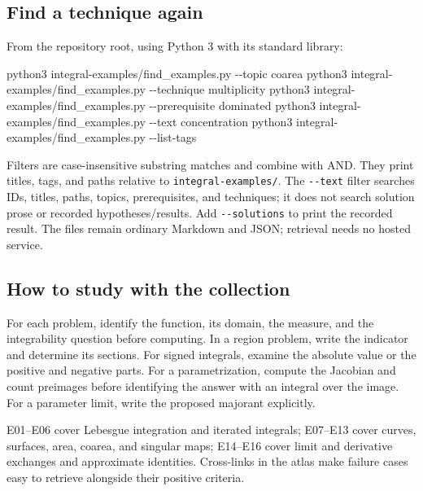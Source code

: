 \documentclass[
  11pt,
]{article}
\newenvironment{Shaded}{}{}
\newcommand{\AttributeTok}[1]{\textcolor[rgb]{0.49,0.56,0.16}{#1}}
\newcommand{\ExtensionTok}[1]{#1}
\newcommand{\NormalTok}[1]{#1}
\begin{document}
\subsection{Find a technique again}\label{find-a-technique-again}

From the repository root, using Python 3 with its standard library:

\begin{Shaded}
\begin{Highlighting}[]
\ExtensionTok{python3}\NormalTok{ integral{-}examples/find\_examples.py }\AttributeTok{{-}{-}topic}\NormalTok{ coarea}
\ExtensionTok{python3}\NormalTok{ integral{-}examples/find\_examples.py }\AttributeTok{{-}{-}technique}\NormalTok{ multiplicity}
\ExtensionTok{python3}\NormalTok{ integral{-}examples/find\_examples.py }\AttributeTok{{-}{-}prerequisite}\NormalTok{ dominated}
\ExtensionTok{python3}\NormalTok{ integral{-}examples/find\_examples.py }\AttributeTok{{-}{-}text}\NormalTok{ concentration}
\ExtensionTok{python3}\NormalTok{ integral{-}examples/find\_examples.py }\AttributeTok{{-}{-}list{-}tags}
\end{Highlighting}
\end{Shaded}

Filters are case-insensitive substring matches and combine with AND.
They print titles, tags, and paths relative to
\texttt{integral-\allowbreak{}examples/\allowbreak{}}. The \texttt{-\/-text} filter searches IDs,
titles, paths, topics, prerequisites, and techniques; it does not search
solution prose or recorded hypotheses/results. Add
\texttt{-\/-solutions} to print the recorded result. The files remain
ordinary Markdown and JSON; retrieval needs no hosted service.

\subsection{How to study with the
collection}\label{how-to-study-with-the-collection}

For each problem, identify the function, its domain, the measure, and
the integrability question before computing. In a region problem, write
the indicator and determine its sections. For signed integrals, examine
the absolute value or the positive and negative parts. For a
parametrization, compute the Jacobian and count preimages before
identifying the answer with an integral over the image. For a parameter
limit, write the proposed majorant explicitly.

E01--E06 cover Lebesgue integration and iterated integrals; E07--E13
cover curves, surfaces, area, coarea, and singular maps; E14--E16 cover
limit and derivative exchanges and approximate identities. Cross-links
in the atlas make failure cases easy to retrieve alongside their
positive criteria.
\end{document}
